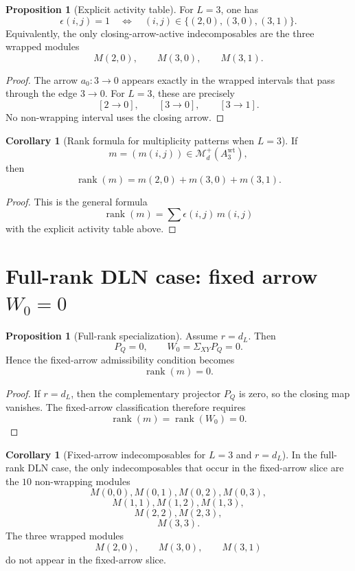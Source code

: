\documentclass{article}
\newcommand{\rk}{\operatorname{rank}}
\theoremstyle{definition}
\newtheorem{proposition}[theorem]{Proposition}
\newtheorem{corollary}[theorem]{Corollary}
\begin{document}
\begin{proposition}[Explicit activity table]
For $L=3$, one has
\[
\epsilon(i,j)=1
\quad\Longleftrightarrow\quad
(i,j)\in \{(2,0),(3,0),(3,1)\}.
\]
Equivalently, the only closing-arrow-active indecomposables are the three
wrapped modules
\[
M(2,0),\qquad M(3,0),\qquad M(3,1).
\]
\end{proposition}

\begin{proof}
The arrow $a_0:3\to 0$ appears exactly in the wrapped intervals that pass
through the edge $3\to 0$. For $L=3$, these are precisely
\[
[2\to 0],\qquad [3\to 0],\qquad [3\to 1].
\]
No non-wrapping interval uses the closing arrow.
\end{proof}

\begin{corollary}[Rank formula for multiplicity patterns when $L=3$]
If
\[
m=(m(i,j))\in \mathcal M_d^+(A_3^{\mathrm{wt}}),
\]
then
\[
\rk(m)=m(2,0)+m(3,0)+m(3,1).
\]
\end{corollary}

\begin{proof}
This is the general formula
\[
\rk(m)=\sum \epsilon(i,j)\,m(i,j)
\]
with the explicit activity table above.
\end{proof}

\section{Full-rank DLN case: fixed arrow $W_0=0$}

\begin{proposition}[Full-rank specialization]
Assume $r=d_L$. Then
\[
P_Q=0,
\qquad
W_0=\Sigma_{XY}P_Q=0.
\]
Hence the fixed-arrow admissibility condition becomes
\[
\rk(m)=0.
\]
\end{proposition}

\begin{proof}
If $r=d_L$, then the complementary projector $P_Q$ is zero, so the closing map
vanishes. The fixed-arrow classification therefore requires
\[
\rk(m)=\rk(W_0)=0.
\]
\end{proof}

\begin{corollary}[Fixed-arrow indecomposables for $L=3$ and $r=d_L$]
In the full-rank DLN case, the only indecomposables that occur in the fixed-arrow
slice are the $10$ non-wrapping modules
\[
M(0,0),M(0,1),M(0,2),M(0,3),
\]
\[
M(1,1),M(1,2),M(1,3),
\]
\[
M(2,2),M(2,3),
\]
\[
M(3,3).
\]
The three wrapped modules
\[
M(2,0),\qquad M(3,0),\qquad M(3,1)
\]
do not appear in the fixed-arrow slice.
\end{corollary}
\end{document}

